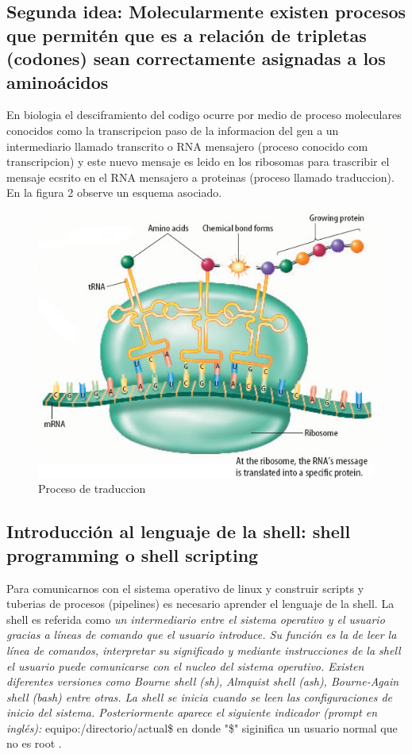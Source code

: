 \documentclass[10pt]{article}
\begin{document}
\newpage 
\subsection{Segunda idea: Molecularmente existen procesos que permitén que es a relación de tripletas (codones) sean correctamente asignadas a los aminoácidos}

En biologia el desciframiento del codigo ocurre por medio de proceso
moleculares conocidos como la transcripcion paso de la informacion del gen a
un intermediario llamado transcrito o RNA mensajero (proceso conocido com transcripcion) y
este nuevo mensaje es leido en los ribosomas para trascribir el mensaje
ecsrito en el RNA mensajero  a proteinas (proceso llamado traduccion). En la
figura 2 observe un esquema asociado.

\begin{figure}[htb!] 
\includegraphics[scale=0.5]{./figures/translation.jpg}
\caption{Proceso de traduccion}
\end{figure}


\subsection{Introducción al lenguaje de la shell: shell programming o shell scripting}

Para comunicarnos con el sistema operativo de linux y construir scripts y tuberias de procesos (pipelines) es necesario aprender el lenguaje de la shell. La shell es referida como \textit{un intermediario entre el sistema operativo y el usuario gracias a líneas de comando que el usuario introduce. Su función es la de leer la línea de comandos, interpretar su significado y mediante instrucciones de la shell el usuario puede comunicarse con el nucleo del sistema operativo. Existen diferentes versiones como Bourne shell (sh), Almquist shell (ash), Bourne-Again shell (bash) entre otras. La shell se inicia cuando se leen las configuraciones de inicio del sistema. Posteriormente  aparece el siguiente indicador (prompt en inglés):}
equipo:/directorio/actual\$ en donde "\$" siginifica un usuario normal que no es root .
\end{document}
